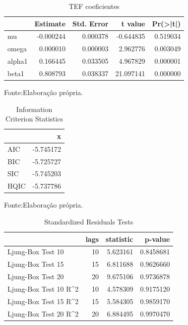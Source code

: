 \documentclass[
  12pt,
  a4paper,
  openany]{book}
\begin{document}
\begin{table}[!h]

\caption{\label{tab:unnamed-chunk-19}TEF coeficientes}
\centering
\begin{tabular}[t]{lrrrr}
\toprule
  &  Estimate &  Std. Error &  t value & Pr(>|t|)\\
\midrule
mu & -0.000244 & 0.000378 & -0.644835 & 0.519034\\
omega & 0.000010 & 0.000003 & 2.962776 & 0.003049\\
alpha1 & 0.166445 & 0.033505 & 4.967829 & 0.000001\\
beta1 & 0.808793 & 0.038337 & 21.097141 & 0.000000\\
\bottomrule
\end{tabular}
\end{table}
\FloatBarrier
\centering

Fonte:Elaboração própria.

\justifying
\bigskip

\begin{table}[!h]

\caption{\label{tab:unnamed-chunk-20}Information Criterion Statistics}
\centering
\begin{tabular}[t]{lr}
\toprule
  & x\\
\midrule
AIC & -5.745172\\
BIC & -5.725727\\
SIC & -5.745203\\
HQIC & -5.737786\\
\bottomrule
\end{tabular}
\end{table}
\FloatBarrier
\centering

Fonte:Elaboração própria.

\justifying
\bigskip

\begin{table}[!h]

\caption{\label{tab:unnamed-chunk-21}Standardized Residuals Tests}
\centering
\begin{tabular}[t]{lrrr}
\toprule
  & lags & statistic & p-value\\
\midrule
Ljung-Box Test 10 & 10 & 5.623161 & 0.8458681\\
Ljung-Box Test 15 & 15 & 6.811688 & 0.9626660\\
Ljung-Box Test 20 & 20 & 9.675106 & 0.9736878\\
Ljung-Box Test 10 R\textasciicircum{}2 & 10 & 4.578309 & 0.9175120\\
Ljung-Box Test 15 R\textasciicircum{}2 & 15 & 5.584305 & 0.9859170\\
\addlinespace
Ljung-Box Test 20 R\textasciicircum{}2 & 20 & 6.884495 & 0.9970470\\
\bottomrule
\end{tabular}
\end{table}
\FloatBarrier
\centering
\end{document}
